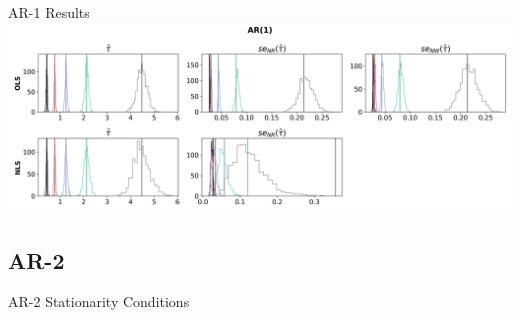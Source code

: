 \documentclass[12pt]{beamer}
\begin{document}
\begin{frame}{AR-1 Results}
\includegraphics[width=1\textwidth]{latex/slides/sim-ar1.png}
\end{frame}

\subsection{AR-2}
\begin{frame}{AR-2 Stationarity Conditions}
\centering
{}
\end{frame}
\end{document}
